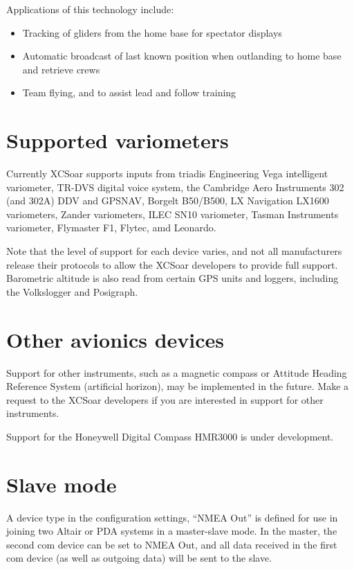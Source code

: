 \documentclass[a4paper,12pt]{refrep}
\begin{document}
Applications of this technology include:
\begin{itemize}
\item Tracking of gliders from the home base for spectator displays
\item Automatic broadcast of last known position when outlanding
  to home base and retrieve crews
\item Team flying, and to assist lead and follow training
\end{itemize}

\section{Supported variometers}\label{sec:supported-varios}

Currently XCSoar supports inputs from triadis Engineering Vega intelligent
variometer, TR-DVS digital voice system, the Cambridge Aero Instruments 302 (and
302A) DDV and GPSNAV, Borgelt B50/B500, LX Navigation LX1600 variometers,
Zander variometers, ILEC SN10 variometer, Tasman Instruments variometer,
Flymaster F1, Flytec, amd Leonardo. 

Note that the level of support for each device varies, and not all manufacturers
release their protocols to allow the XCSoar developers to provide full support. 
Barometric altitude is also read from certain GPS units and loggers, including
the Volkslogger and Posigraph.

\section{Other avionics devices}

Support for other instruments, such as a magnetic compass or Attitude
Heading Reference System (artificial horizon), may be implemented in
the future.  Make a request to the XCSoar developers if you are
interested in support for other instruments.

Support for the Honeywell Digital Compass HMR3000 is under
development.

\section{Slave mode}

A device type in the configuration settings, ``NMEA Out'' is defined
for use in joining two Altair or PDA systems in a master-slave mode.
In the master, the second com device can be set to NMEA Out, and all
data received in the first com device (as well as outgoing data) will
be sent to the slave.  
\end{document}
